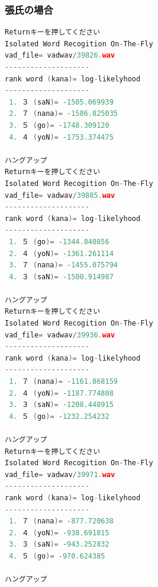 \documentclass[11pt,a4paper, uplatex]{jsarticle}
\begin{document}
\subsubsection{張氏の場合}
\begin{lstlisting}[language=c, caption=\texttt{recog}実行結果(張氏)]
Returnキーを押してください
Isolated Word Recogition On-The-Fly
vad_file= vadwav/39826.wav
--------------------
rank word (kana)= log-likelyhood
--------------------
 1. ３ (saN)= -1505.069939
 2. ７ (nana)= -1586.825035
 3. ５ (go)= -1748.309120
 4. ４ (yoN)= -1753.374475

ハングアップ
Returnキーを押してください
Isolated Word Recogition On-The-Fly
vad_file= vadwav/39885.wav
--------------------
rank word (kana)= log-likelyhood
--------------------
 1. ５ (go)= -1344.840856
 2. ４ (yoN)= -1361.261114
 3. ７ (nana)= -1455.075794
 4. ３ (saN)= -1500.914987

ハングアップ
Returnキーを押してください
Isolated Word Recogition On-The-Fly
vad_file= vadwav/39936.wav
--------------------
rank word (kana)= log-likelyhood
--------------------
 1. ７ (nana)= -1161.868159
 2. ４ (yoN)= -1187.774808
 3. ３ (saN)= -1208.448915
 4. ５ (go)= -1232.254232

ハングアップ
Returnキーを押してください
Isolated Word Recogition On-The-Fly
vad_file= vadwav/39971.wav
--------------------
rank word (kana)= log-likelyhood
--------------------
 1. ７ (nana)= -877.720638
 2. ４ (yoN)= -938.691815
 3. ３ (saN)= -943.252832
 4. ５ (go)= -970.624385

ハングアップ
\end{lstlisting}
\end{document}

